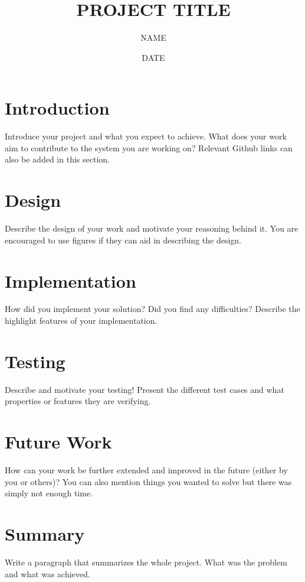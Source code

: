 \documentclass{article}
\title{PROJECT TITLE}
\author{NAME }
\date{DATE}
\begin{document}
\maketitle

\section{Introduction}
Introduce your project and what you expect to achieve. What does your work aim to contribute to the system you are working on?
\newline\newline
Relevant Github links can also be added in this section.

\section{Design}
Describe the design of your work and motivate your reasoning behind it. You are encouraged to use figures if they can aid in describing the design.

\section{Implementation}
How did you implement your solution? Did you find any difficulties? Describe the highlight features of your implementation.

\section{Testing}
Describe and motivate your testing! Present the different test cases and what properties or features they are verifying.

\section{Future Work}
How can your work be further extended and improved in the future (either by you or others)? You can also mention things you wanted to solve but there was simply not enough time.

\section{Summary}
Write a paragraph that summarizes the whole project. What was the problem and what was achieved. 
\end{document}
